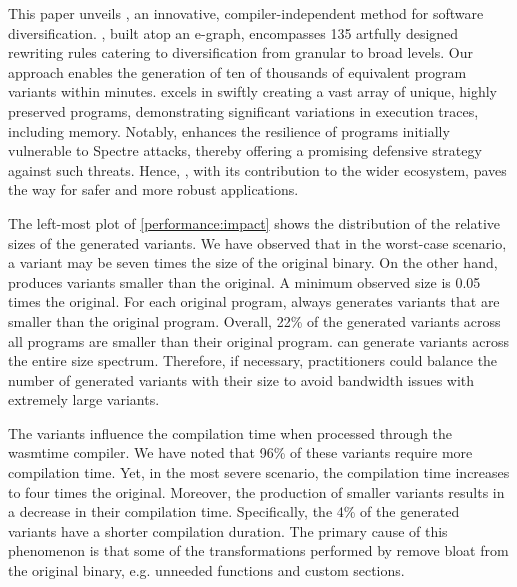 This paper unveils \tool, an innovative, compiler-independent method for \Wasm software diversification. \tool, built atop an e-graph, encompasses 135 artfully designed rewriting rules catering to diversification from granular to broad levels. 
Our approach enables the generation of ten of thousands of equivalent program variants within minutes. 
\tool excels in swiftly creating a vast array of unique, highly preserved \wasm programs, demonstrating significant variations in execution traces, including memory. 
Notably, \tool enhances the resilience of \wasm programs initially vulnerable to Spectre attacks, thereby offering a promising defensive strategy against such threats. 
Hence, \tool, with its contribution to the wider \wasm ecosystem, paves the way for safer and more robust \wasm applications.



The left-most plot of \autoref{performance:impact} shows the distribution of the relative sizes of the generated \Wasm variants.
We have observed that in the worst-case scenario, a variant may be seven times the size of the original binary.
On the other hand, \tool produces variants smaller than the original.
A minimum observed size is 0.05 times the original.
For each original program, \tool always generates variants that are smaller than the original program.
Overall, 22\% of the generated variants across all programs are smaller than their original program.
\tool can generate \Wasm variants across the entire size spectrum.
Therefore, if necessary, practitioners could balance the number of generated variants with their size to avoid bandwidth issues with extremely large variants.

The \tool variants influence the compilation time when processed through the wasmtime compiler. 
We have noted that 96\% of these variants require more compilation time. 
Yet, in the most severe scenario, the compilation time increases to four times the original. 
Moreover, the production of smaller variants results in a decrease in their compilation time. 
Specifically, the 4\% of the generated variants have a shorter compilation duration. 
The primary cause of this phenomenon is that some of the transformations performed by \tool remove bloat from the original binary, e.g. unneeded functions and custom sections.


